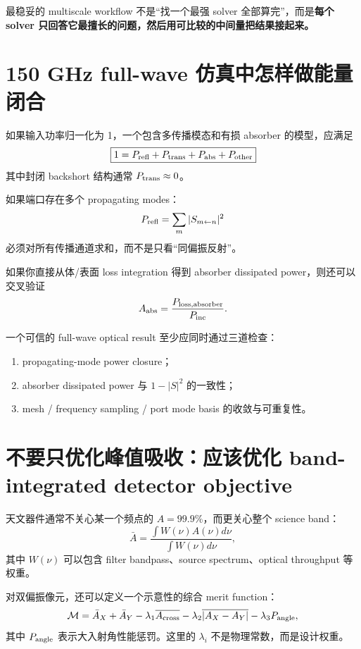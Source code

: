 \documentclass[11pt,a4paper,openany]{ctexrep}
\begin{document}
\begin{intuitionbox}
最稳妥的 multiscale workflow 不是“找一个最强 solver 全部算完”，而是\textbf{每个 solver 只回答它最擅长的问题，然后用可比较的中间量把结果接起来。}
\end{intuitionbox}

\section{150 GHz full-wave 仿真中怎样做能量闭合}

如果输入功率归一化为 1，一个包含多传播模态和有损 absorber 的模型，应满足
\[
\boxed{
1=P_{\rm refl}+P_{\rm trans}+P_{\rm abs}+P_{\rm other}
}
\]
其中封闭 backshort 结构通常 $P_{\rm trans}\approx0$。

如果端口存在多个 propagating modes：
\[
P_{\rm refl}=\sum_m |S_{m\leftarrow n}|^2
\]
必须对所有传播通道求和，而不是只看“同偏振反射”。

如果你直接从体/表面 loss integration 得到 absorber dissipated power，则还可以交叉验证
\[
A_{\rm abs}=\frac{P_{\rm loss,absorber}}{P_{\rm inc}}.
\]

\begin{checkpointbox}
一个可信的 full-wave optical result 至少应同时通过三道检查：
\begin{enumerate}
  \item propagating-mode power closure；
  \item absorber dissipated power 与 $1-|S|^2$ 的一致性；
  \item mesh / frequency sampling / port mode basis 的收敛与可重复性。
\end{enumerate}
\end{checkpointbox}

\section{不要只优化峰值吸收：应该优化 band-integrated detector objective}

天文器件通常不关心某一个频点的 $A=99.9\%$，而更关心整个 science band：
\[
\bar A=\frac{\int W(\nu)A(\nu)d\nu}{\int W(\nu)d\nu},
\]
其中 $W(\nu)$ 可以包含 filter bandpass、source spectrum、optical throughput 等权重。

对双偏振像元，还可以定义一个示意性的综合 merit function：
\[
\mathcal M=
\bar A_X+\bar A_Y
-\lambda_1\overline{A_{\rm cross}}
-\lambda_2\overline{|A_X-A_Y|}
-\lambda_3 P_{\rm angle},
\]
其中 $P_{\rm angle}$ 表示大入射角性能惩罚。这里的 $\lambda_i$ 不是物理常数，而是设计权重。
\end{document}

